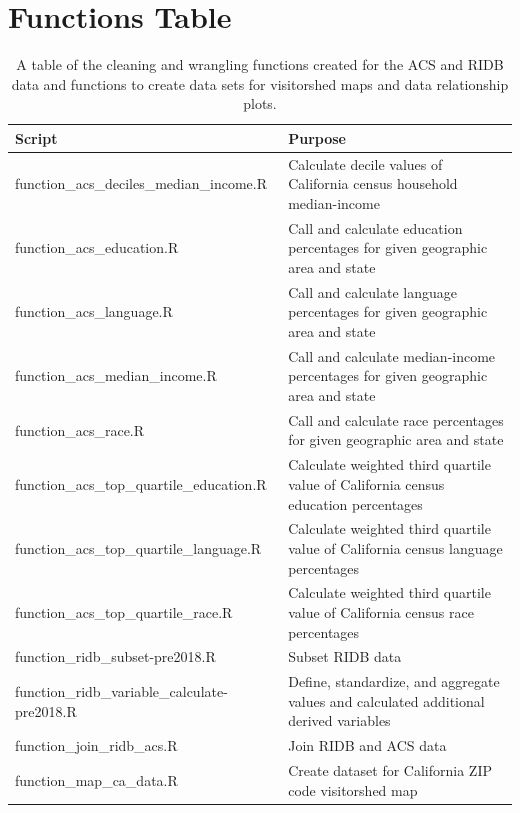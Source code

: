 \documentclass[
  11 pt,
  openany]{book}
\begin{document}
\newpage

\hypertarget{functions-table}{%
\section{Functions Table}\label{functions-table}}

\begin{table}

\caption{\label{tab:func-table1}A table of the cleaning and wrangling functions created for the ACS and RIDB data and functions to create data sets for visitorshed maps and data relationship plots.}
\begin{tabu} to 
\hline
Script & Purpose\\
\hline
function\_acs\_deciles\_median\_income.R & Calculate decile values of California census household median-income\\
\hline
function\_acs\_education.R & Call and calculate education percentages for given geographic area and state\\
\hline
function\_acs\_language.R & Call and calculate language percentages for given geographic area and state\\
\hline
function\_acs\_median\_income.R & Call and calculate median-income percentages for given geographic area and state\\
\hline
function\_acs\_race.R & Call and calculate race percentages for given geographic area and state\\
\hline
function\_acs\_top\_quartile\_education.R & Calculate weighted third quartile value of California census education percentages\\
\hline
function\_acs\_top\_quartile\_language.R & Calculate weighted third quartile value of California census language percentages\\
\hline
function\_acs\_top\_quartile\_race.R & Calculate weighted third quartile value of California census race percentages\\
\hline
function\_ridb\_subset-pre2018.R & Subset RIDB data\\
\hline
function\_ridb\_variable\_calculate-pre2018.R & Define, standardize, and aggregate values and calculated additional derived variables\\
\hline
function\_join\_ridb\_acs.R & Join RIDB and ACS data\\
\hline
function\_map\_ca\_data.R & Create dataset for California ZIP code visitorshed map\\

\end{tabu}
\end{table}
\end{document}
